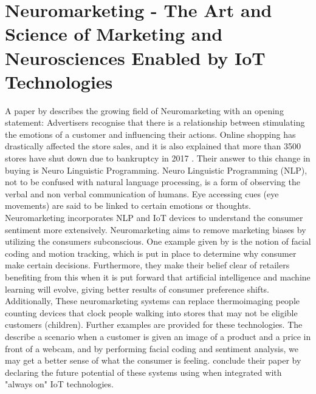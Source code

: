 \section*{Neuromarketing - The Art and Science of Marketing and Neurosciences Enabled by IoT Technologies}
A paper by \citeauthor{arthmann} describes the growing field of Neuromarketing with an opening statement: Advertisers recognise that there is a relationship between stimulating the emotions of a customer and influencing their actions. Online shopping has drastically affected the store sales, and it is also explained that more than 3500 stores have shut down due to bankruptcy in 2017 \citep{arthmann}. Their answer to this change in buying is Neuro Linguistic Programming. Neuro Linguistic Programming (NLP), not to be confused with natural language processing, is a form of observing the verbal and non verbal communication of humans. Eye accessing cues (eye movements) are said to be linked to certain emotions or thoughts. Neuromarketing incorporates NLP and IoT devices to understand the consumer sentiment more extensively. Neuromarketing aims to remove marketing biases by utilizing the consumers subconscious. One example given by \citeauthor{arthmann} is the notion of facial coding and motion tracking, which is put in place to determine why consumer make certain decisions. 
Furthermore, they make their belief clear of retailers benefiting from this when it is put forward that artificial intelligence and machine learning will evolve, giving better results of consumer preference shifts. Additionally, These neuromarketing systems can replace thermoimaging people counting devices that clock people walking into stores that may not be eligible customers (children). Further examples are provided for these technologies. The describe a scenario when a customer is given an image of a product and a price in front of a webcam, and by performing facial coding and sentiment analysis, we may get a better sense of what the consumer is feeling.
\citeauthor{arthmann} conclude their paper by declaring the future potential of these systems using when integrated with "always on" IoT technologies. 

